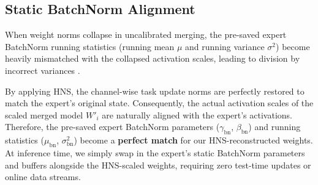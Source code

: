 \documentclass{article}
\theoremstyle{plain}
\theoremstyle{definition}
\theoremstyle{remark}
\begin{document}
\subsection{Static BatchNorm Alignment}
When weight norms collapse in uncalibrated merging, the pre-saved expert BatchNorm running statistics (running mean $\mu$ and running variance $\sigma^2$) become heavily mismatched with the collapsed activation scales, leading to division by incorrect variances \cite{ioffe15, jordan23}.

By applying HNS, the channel-wise task update norms are perfectly restored to match the expert's original state. Consequently, the actual activation scales of the scaled merged model $W'_i$ are naturally aligned with the expert's activations. Therefore, the pre-saved expert BatchNorm parameters ($\gamma_{\text{bn}}$, $\beta_{\text{bn}}$) and running statistics ($\mu_{\text{bn}}$, $\sigma_{\text{bn}}^2$) become a \textbf{perfect match} for our HNS-reconstructed weights. At inference time, we simply swap in the expert's static BatchNorm parameters and buffers alongside the HNS-scaled weights, requiring zero test-time updates or online data streams.
\end{document}
